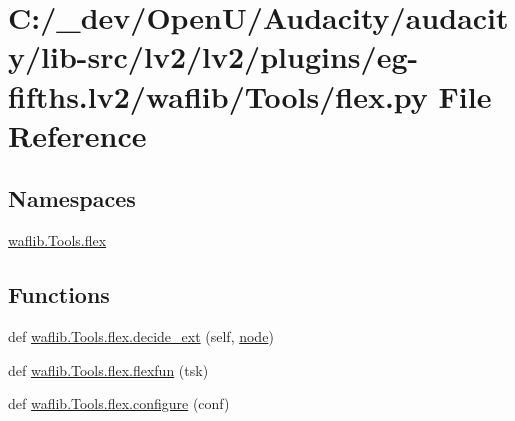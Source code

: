 \hypertarget{lv2_2plugins_2eg-fifths_8lv2_2waflib_2_tools_2flex_8py}{}\section{C\+:/\+\_\+dev/\+Open\+U/\+Audacity/audacity/lib-\/src/lv2/lv2/plugins/eg-\/fifths.lv2/waflib/\+Tools/flex.py File Reference}
\label{lv2_2plugins_2eg-fifths_8lv2_2waflib_2_tools_2flex_8py}
\subsection*{Namespaces}
\begin{DoxyCompactItemize}
\item 
 \hyperlink{namespacewaflib_1_1_tools_1_1flex}{waflib.\+Tools.\+flex}
\end{DoxyCompactItemize}
\subsection*{Functions}
\begin{DoxyCompactItemize}
\item 
def \hyperlink{namespacewaflib_1_1_tools_1_1flex_aac8b14ed3ea22ad22a4ead7f11b8667d}{waflib.\+Tools.\+flex.\+decide\+\_\+ext} (self, \hyperlink{structnode}{node})
\item 
def \hyperlink{namespacewaflib_1_1_tools_1_1flex_aed89723ff6789a05a9e312ca0ddb1acf}{waflib.\+Tools.\+flex.\+flexfun} (tsk)
\item 
def \hyperlink{namespacewaflib_1_1_tools_1_1flex_af98941bb6505104e007e22e2be6da162}{waflib.\+Tools.\+flex.\+configure} (conf)
\end{DoxyCompactItemize}
